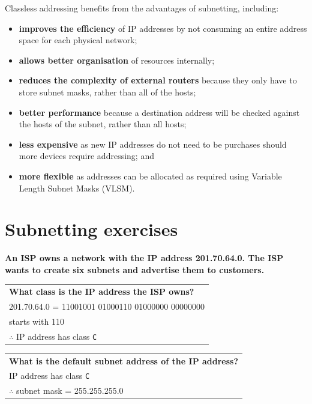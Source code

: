 \documentclass[a4paper]{systems-software}
\begin{document}
Classless addressing benefits from the advantages of subnetting, including:
\begin{itemize}
	\item \textbf{improves the efficiency} of IP addresses by not consuming an entire address space for each physical network;
	\item \textbf{allows better organisation} of resources internally;
	\item \textbf{reduces the complexity of external routers} because they only have to store subnet masks, rather than all of the hosts;
	\item \textbf{better performance} because a destination address will be checked against the hosts of the subnet, rather than all hosts;
	\item \textbf{less expensive} as new IP addresses do not need to be purchases should more devices require addressing; and
	\item \textbf{more flexible} as addresses can be allocated as required using Variable Length Subnet Masks (VLSM).
\end{itemize}


\section*{Subnetting exercises}

\textbf{An ISP owns a network with the IP address 201.70.64.0. The ISP wants to create six subnets and advertise them to customers.}

\begin{longtabu} to \textwidth {| X[1,l] |}
	\hline
	\textbf{What class is the IP address the ISP owns?} \\
	\vspace{2.5mm}
	201.70.64.0 = 11001001 01000110 01000000 00000000 \\
	starts with 110 \\
	$\therefore$ IP address has class \texttt{C} \\
	\hline
\end{longtabu}

\begin{longtabu} to \textwidth {| X[1,l] |}
	\hline
	\textbf{What is the default subnet address of the IP address?} \\
	\vspace{2.5mm}
	IP address has class \texttt{C} \\
	$\therefore$ subnet mask = 255.255.255.0 \\
	\hline
\end{longtabu}
\end{document}

